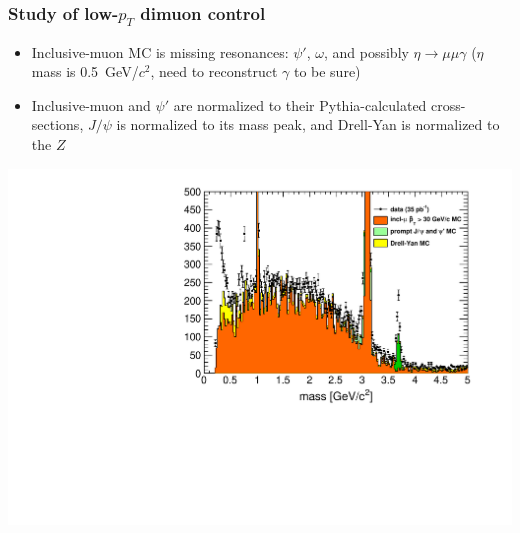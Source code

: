 \documentclass[compress]{beamer}
\begin{document}
\begin{frame}
\frametitle{Study of low-$p_T$ dimuon control}

\begin{itemize}
\item Inclusive-muon MC is missing resonances: $\psi'$, $\omega$, and possibly $\eta \to \mu\mu\gamma$ ($\eta$ mass is 0.5~GeV/$c^2$, need to reconstruct $\gamma$ to be sure)
\item Inclusive-muon and $\psi'$ are normalized to their
  Pythia-calculated cross-sections, $J/\psi$ is normalized to its mass
  peak, and Drell-Yan is normalized to the $Z$
\end{itemize}

\begin{center}
\includegraphics[width=0.8\linewidth]{lowdimuon_mass_nobcuts.pdf}
\end{center}
\end{frame}
\end{document}
